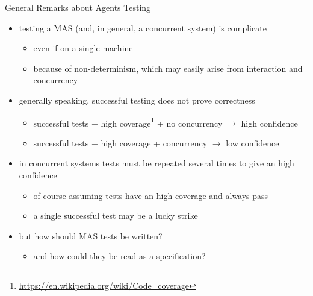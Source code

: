 \documentclass{beamer}\mode<presentation>{\usetheme{AMSCesenaPurpleAndGold}}
\begin{document}
\begin{frame}[c]{General Remarks about Agents Testing}
	
	\begin{itemize}
		\item testing a MAS (and, in general, a concurrent system) is complicate
		\begin{itemize}
			\item even if on a single machine
			\item because of \alert{non-determinism}, which may easily arise from \alert{interaction} and \alert{concurrency}
		\end{itemize}
	
		\vfill
	
		\item generally speaking, successful testing \alert{does not prove} correctness
		\begin{itemize}
			\item successful tests + high coverage\footnote{\url{https://en.wikipedia.org/wiki/Code_coverage}} + no concurrency $\rightarrow$ high confidence
			\item successful tests + high coverage + concurrency $\rightarrow$ low confidence
		\end{itemize}
	
		\vfill
		
		\item in concurrent systems tests must be repeated \alert{several times} to give an high confidence 
		\begin{itemize}
			\item of course assuming tests have an high coverage and always pass
			\item a single successful test may be a lucky strike
		\end{itemize}
	
		\vfill
		
		\item but how should MAS tests be written?
		\begin{itemize}
			\item and how could they be read as a specification?
		\end{itemize}
		
	\end{itemize}
	
\end{frame}
\end{document}
